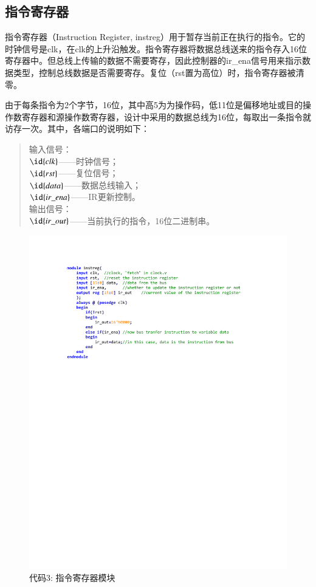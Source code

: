 \documentclass[titlepage, 11pt]{article}
\begin{document}
	\subsection{指令寄存器}
		指令寄存器（Instruction Register, instreg）用于暂存当前正在执行的指令。它的时钟信号是clk，在clk的上升沿触发。指令寄存器将数据总线送来的指令存入16位寄存器中。但总线上传输的数据不需要寄存，因此控制器的ir\_ena信号用来指示数据类型，控制总线数据是否需要寄存。复位（rst置为高位）时，指令寄存器被清零。\par 
		由于每条指令为2个字节，16位，其中高5为为操作码，低11位是偏移地址或目的操作数寄存器和源操作数寄存器，设计中采用的数据总线为16位，每取出一条指令就访存一次。其中，各端口的说明如下：
		\begin{quote}
			输入信号：\\
			$\id{clk}$——时钟信号；\\
			$\id{rst}$——复位信号；\\
			$\id{data}$——数据总线输入；\\
			$\id{ir\_ena}$——IR更新控制。\\
			输出信号：\\
			$\id{ir\_out}$——当前执行的指令，16位二进制串。
		\end{quote}
		\begin{figure}[H]
			\centering
			\includegraphics[scale=1]{18.pdf}
			\caption*{代码3: 指令寄存器模块}
		\end{figure}
\end{document}
